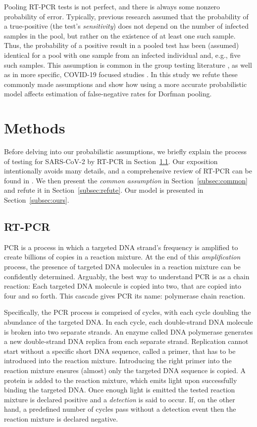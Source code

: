 \documentclass{article}
\begin{document}
Pooling RT-PCR tests is not perfect, and there is always some nonzero
probability of error. Typically, previous research assumed that the probability of a true-positive (the test's \emph{sensitivity}) does not depend on the
number of infected samples in the pool, but rather on the existence of
at least one such sample. Thus, the probability of a positive result
in a pooled test has been (assumed) identical for a pool with one sample
from an infected individual and, e.g., five such samples. This
assumption is common in the group testing literature \cite{Kim,
  OptimalDorfmanPool}, as well as in more specific, COVID-19 focused
studies \cite{Simplistic1, Simplistic2}. In this study we refute these
commonly made assumptions and show how using a more accurate probabilistic model affects estimation of
false-negative rates for Dorfman pooling.

\section{Methods}
Before delving into our probabilistic assumptions, we briefly explain
the process of testing for SARS-CoV-2 by RT-PCR in
Section~\ref{subsec:rtpcr}. Our exposition intentionally avoids many
details, and a comprehensive review of RT-PCR can be found in
\cite{COVID-RTPCR, PCRBook}. We then present the \emph{common
  assumption} in Section~\ref{subsec:common} and refute it in
Section~\ref{subsec:refute}. Our model is presented in
Section~\ref{subsec:ours}.

\subsection{RT-PCR}\label{subsec:rtpcr}
PCR is a process in which a targeted DNA strand's frequency is
amplified to create billions of copies in a reaction mixture. At the
end of this \emph{amplification} process, the presence of targeted DNA
molecules in a reaction mixture can be confidently
determined. Arguably, the best way to understand PCR is as a chain
reaction: Each targeted DNA molecule is copied into two, that are
copied into four and so forth. This cascade gives PCR its name:
polymerase chain reaction.

Specifically, the PCR process is comprised of cycles, with each cycle
doubling the abundance of the targeted DNA. In each cycle, each
double-strand DNA molecule is broken into two separate strands. An
enzyme called DNA polymerase generates a new double-strand DNA replica
from each separate strand. Replication cannot start without a specific
short DNA sequence, called a primer, that has to be introduced into
the reaction mixture. Introducing the right primer into the reaction
mixture ensures (almost) only the targeted DNA sequence is copied. A
protein is added to the reaction mixture, which emits light upon
successfully binding the targeted DNA. Once enough light is emitted
the tested reaction mixture is declared positive and a
\emph{detection} is said to occur. If, on the other hand, a predefined
number of cycles pass without a detection event then the reaction
mixture is declared negative.
\end{document}
